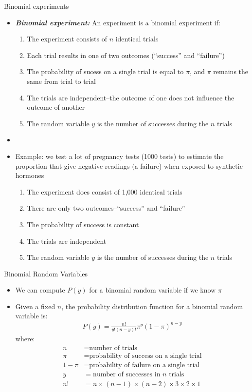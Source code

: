 \documentclass[xcolor=dvipsnames]{beamer}
\begin{document}
\begin{frame}{Binomial experiments}
	\begin{itemize}
		\item \textbf{\emph{Binomial experiment:}} An experiment is a binomial experiment if:
		\begin{enumerate}
			\item The experiment consists of $n$ identical trials
			\item Each trial results in one of two outcomes (``success'' and ``failure'')
			\item The probability of sucess on a single trial is equal to $\pi$, and $\pi$ remains the same from trial to trial
			\item The trials are independent--the outcome of one does not influence the outcome of another
			\item The random variable $y$ is the number of successes during the $n$ trials
		\end{enumerate}
	\item[]
	\item Example: we test a lot of pregnancy tests (1000 tests) to estimate the proportion that give negative readings (a failure) when exposed to synthetic hormones
	\begin{enumerate}
		\item The experiment does consist of 1,000 identical trials
		\item There are only two outcomes--``success'' and ``failure''
		\item The probability of success is constant
		\item The trials are independent 
		\item The random variable $y$ is the number of successes during the $n$ trials
	\end{enumerate}
	\end{itemize}
\end{frame}

\begin{frame}{Binomial Random Variables}
	\begin{itemize}
		\item We can compute $P(y)$ for a binomial random variable if we know $\pi$
		\item Given a fixed $n$, the probability distribution function for a binomial random variable is: 
		\begin{gather*}
		P(y) = \frac{n!}{y!(n-y)!} \pi^y (1-\pi)^{n-y}
		\end{gather*}
		where:
		\begin{align*}
		n &= \text{number of trials} \\
		\pi &= \text{probability of success on a single trial} \\ 
		1- \pi &= \text{probability of failure on a single trial} \\
		y &= \text{number of successes in $n$ trials} \\
		n! &= n \times (n-1) \times (n-2) \times 3 \times 2 \times 1
		\end{align*}
	\end{itemize}
\end{frame}
\end{document}
